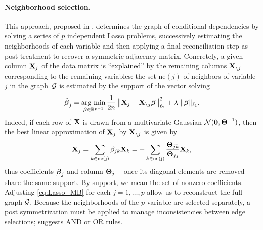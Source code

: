 \paragraph*{Neighborhood  selection.}   This   approach,  proposed  in
\cite{2006_AS_Meinshausen},  determines   the  graph   of  conditional
dependencies by  solving a series  of $p$ independent  Lasso problems,
successively estimating  the neighborhoods  of each variable  and then
applying a  final reconciliation step  as post-treatment to  recover a
symmetric adjacency matrix.  Concretely, a given column $\mathbf{X}_j$ of the
data matrix is ``explained'' by the remaining columns $\mathbf{X}_{\backslash
  j}$ corresponding to the remaining variables: the set $\text{ne}(j)$
of neighbors of variable~$j$ in the graph~$\mathcal{G}$ is estimated by the
support of the vector solving
\begin{equation}
  \label{eq:Lasso_MB}
  \hatbbeta_j = \argmin_{\bbeta\in\Rset^{p-1}}     \frac{1}{2n}\left\|
    \bX_j   -   \bX_{\backslash   j}   \bbeta
  \right\|_{\ell_2}^2 + \lambda\ \|\bbeta\|_{\ell_1}.
\end{equation}
Indeed, if  each row of  $\mathbf{X}$ is  drawn from a  multivariate Gaussian
$\mathcal{N}(\mathbf{0},\boldsymbol\Theta^{-1})$, then  the best  linear approximation
of $\mathbf{X}_j$ by  $\mathbf{X}_{\backslash j}$ is given by
\begin{equation}
  \label{eq:lincoef2invcov}
  \bX_j = \sum_{k \in \text{ne(j)}} \beta_{jk} \bX_k = - \sum_{k \in \text{ne(j)}} \frac{\invcov_{jk}}{\invcov_{jj}} \bX_{k},
\end{equation}
thus  coefficients  $\boldsymbol\beta_j$  and  column $\boldsymbol\Theta_j$  --  once  its
diagonal elements are  removed -- share the same  support. By support,
we    mean   the    set    of    nonzero   coefficients.     Adjusting
\eqref{eq:Lasso_MB} for each $j=1,\dots,p$ allow us to reconstruct the
full graph $\mathcal{G}$. Because the neighborhoods of the $p$ variable are
selected separately, a  post symmetrization must be  applied to manage
inconsistencies  between  edge selections;  \cite{2006_AS_Meinshausen}
suggests AND or OR rules.

